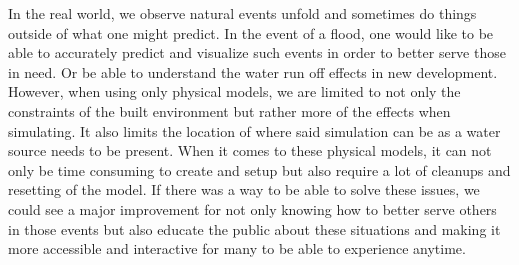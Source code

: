 In the real world, we observe natural events unfold and sometimes do things outside of what one might predict. In the event of a flood, one would like to be able to accurately predict and visualize such events in order to better serve those in need. Or be able to understand the water run off effects in new development. However, when using only physical models, we are limited to not only the constraints of the built environment but rather more of the effects when simulating. It also limits the location of where said simulation can be as a water source needs to be present. When it comes to these physical models, it can not only be time consuming to create and setup but also require a lot of cleanups and resetting of the model. If there was a way to be able to solve these issues, we could see a major improvement for not only knowing how to better serve others in those events but also educate the public about these situations and making it more accessible and interactive for many to be able to experience anytime.
